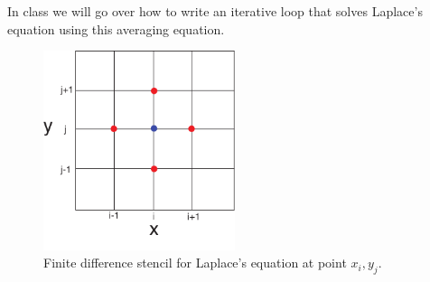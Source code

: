 \documentclass[11pt, oneside]{article}   	%
\begin{document}
In class we will go over how to write an iterative loop that solves Laplace's equation using this averaging equation.
 
\begin{figure}[htbp]
\begin{center}
\includegraphics[width=0.5\textwidth]{grid_laplace.pdf} 
\caption{ Finite difference stencil for Laplace's equation at point $x_i,y_j$. }
\label{gridlaplace}
\end{center}
\end{figure}


 
\end{document}
